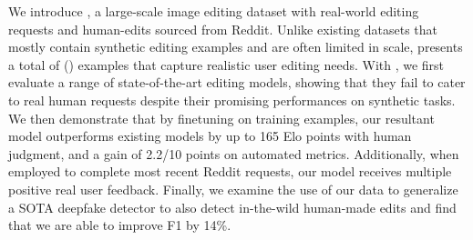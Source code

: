We introduce \RealEdit, a large-scale image editing dataset with real-world editing requests and human-edits sourced from Reddit. Unlike existing datasets that mostly contain synthetic editing examples and are often limited in scale, \RealEdit presents a total of () examples that capture realistic user editing needs. With \RealEdit, we first evaluate a range of state-of-the-art editing models, showing that they fail to cater to real human requests despite their promising performances on synthetic tasks.
We then demonstrate that by finetuning on \RealEdit training examples, our resultant model outperforms existing models by up to 165 Elo points with human judgment, and a gain of 2.2/10 points on automated metrics. Additionally, when employed to complete most recent Reddit requests, our model receives multiple positive real user feedback.
Finally, we examine the use of our data to generalize a SOTA deepfake detector to also detect in-the-wild human-made edits and find that we are able to improve F1 by 14\%.